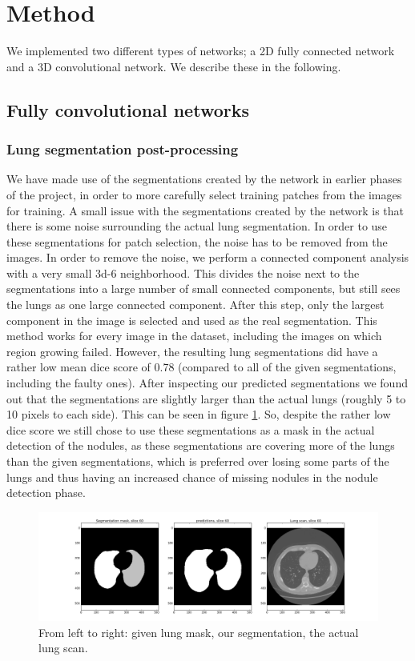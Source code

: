 \documentclass{article}
\begin{document}
	\section{Method}\label{sec:method} 
	We implemented two different types of networks; a 2D fully connected network and a 3D convolutional network. We describe these in the following.
	
	\subsection{Fully convolutional networks}
	\subsubsection{Lung segmentation post-processing}
	We have made use of the segmentations created by the network in earlier phases of the project, in order to more carefully select training patches from the images for training. A small issue with the segmentations created by the network is that there is some noise surrounding the actual lung segmentation. In order to use these segmentations for patch selection, the noise has to be removed from the images. In order to remove the noise, we perform a connected component analysis with a very small 3d-6 neighborhood. This divides the noise next to the segmentations into a large number of small connected components, but still sees the lungs as one large connected component. After this step, only the largest component in the image is selected and used as the real segmentation. This method works for every image in the dataset, including the images on which region growing failed. However, the resulting lung segmentations did have a rather low mean dice score of 0.78 (compared to all of the given segmentations, including the faulty ones). After inspecting our predicted segmentations we found out that the segmentations are slightly larger than the actual lungs (roughly 5 to 10 pixels to each side). This can be seen in figure \ref{fig:lung_segments}. So, despite the rather low dice score we still chose to use these segmentations as a mask in the actual detection of the nodules, as these segmentations are covering more of the lungs than the given segmentations, which is preferred over losing some parts of the lungs and thus having an increased chance of missing nodules in the nodule detection phase.
	\cite{long}
	
	\begin{figure}
		\centering
		\includegraphics[width=\linewidth]{lung_segments.png}
		\caption{From left to right: given lung mask, our segmentation, the actual lung scan.}
		\label{fig:lung_segments}
	\end{figure}
	
\end{document}
